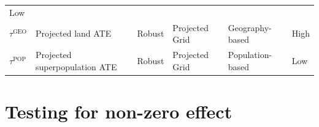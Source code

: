 \documentclass[letter]{article}
\newcommand{\taugeo}{\tau^{\mathrm{GEO}}}
\newcommand{\taupop}{\tau^{\mathrm{POP}}}
\begin{document}
\begin{longtable}[]{@{}llllll@{}}
\begin{minipage}[t]{0.08\columnwidth}
Low\strut
\end{minipage}\tabularnewline
\begin{minipage}[t]{0.09\columnwidth}\raggedright\strut
\(\taugeo\)\strut
\end{minipage} & \begin{minipage}[t]{0.25\columnwidth}\raggedright\strut
Projected land ATE\strut
\end{minipage} & \begin{minipage}[t]{0.13\columnwidth}\raggedright\strut
Robust\strut
\end{minipage} & \begin{minipage}[t]{0.13\columnwidth}\raggedright\strut
Projected Grid\strut
\end{minipage} & \begin{minipage}[t]{0.15\columnwidth}\raggedright\strut
Geography-based\strut
\end{minipage} & \begin{minipage}[t]{0.08\columnwidth}\raggedright\strut
High\strut
\end{minipage}\tabularnewline
\begin{minipage}[t]{0.09\columnwidth}\raggedright\strut
\(\taupop\)\strut
\end{minipage} & \begin{minipage}[t]{0.25\columnwidth}\raggedright\strut
Projected superpopulation ATE\strut
\end{minipage} & \begin{minipage}[t]{0.13\columnwidth}\raggedright\strut
Robust\strut
\end{minipage} & \begin{minipage}[t]{0.13\columnwidth}\raggedright\strut
Projected Grid\strut
\end{minipage} & \begin{minipage}[t]{0.15\columnwidth}\raggedright\strut
Population-based\strut
\end{minipage} & \begin{minipage}[t]{0.08\columnwidth}\raggedright\strut
Low\strut
\end{minipage}\tabularnewline
\bottomrule
\end{longtable}
    


    	\section{Testing for non-zero effect}\label{testing-for-non-zero-effect}
    
\end{document}
